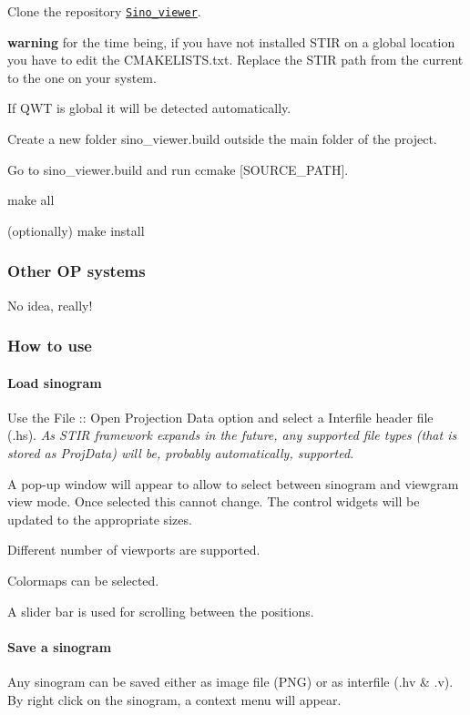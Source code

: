 \begin{DoxyEnumerate}
\item Clone the repository \href{https://github.com/NikEfth/sino_viewer}{\tt Sino\+\_\+viewer}.
\item {\bfseries warning} for the time being, if you have not installed S\+T\+IR on a global location you have to edit the C\+M\+A\+K\+E\+L\+I\+S\+T\+S.\+txt. Replace the S\+T\+IR path from the current to the one on your system.
\item If Q\+WT is global it will be detected automatically.
\item Create a new folder {\ttfamily sino\+\_\+viewer.\+build} outside the main folder of the project.
\item Go to {\ttfamily sino\+\_\+viewer.\+build} and run {\ttfamily ccmake \mbox{[}S\+O\+U\+R\+C\+E\+\_\+\+P\+A\+TH\mbox{]}}.
\item {\ttfamily make all}
\item (optionally) {\ttfamily make install}
\end{DoxyEnumerate}

\subsubsection*{Other OP systems}

No idea, really!

\subsubsection*{How to use}

\paragraph*{Load sinogram}


\begin{DoxyEnumerate}
\item Use the {\ttfamily File \+:\+: Open Projection Data} option and select a Interfile header file (.hs). {\itshape As S\+T\+IR framework expands in the future, any supported file types (that is stored as Proj\+Data) will be, probably automatically, supported}.
\item A pop-\/up window will appear to allow to select between sinogram and viewgram view mode. Once selected this cannot change. The control widgets will be updated to the appropriate sizes.
\item Different number of viewports are supported.
\item Colormaps can be selected. 
\item A slider bar is used for scrolling between the positions.
\end{DoxyEnumerate}

\paragraph*{Save a sinogram}

Any sinogram can be saved either as image file (P\+NG) or as interfile (.hv \& .v). By right click on the sinogram, a context menu will appear.

 